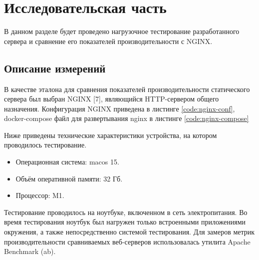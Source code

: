 \section{Исследовательская часть}
В данном разделе будет проведено нагрузочное тестирование разработанного сервера и сравнение его показателей производительности с NGINX.

\subsection{Описание измерений}
В качестве эталона для сравнения показателей производительности статического сервера был выбран NGINX [7], являющийся HTTP-сервером общего назначения. Конфигурация NGINX приведена в листинге \ref{code:nginx-conf}, docker-compose файл для развертывания nginx в листинге \ref{code:nginx-compose}


\newpage


Ниже приведены технические характеристики устройства, на котором проводилось тестирование.
\begin{itemize}
	\item Операционная система: macos 15.
	\item Объём оперативной памяти: 32 Гб.
	\item Процессор: M1.
\end{itemize}

Тестирование проводилось на ноутбуке, включенном в сеть электропитания. Во время тестирования ноутбук был нагружен только встроенными приложениями окружения, а также непосредственно системой тестирования.
Для замеров метрик производительности сравниваемых веб-серверов использовалась утилита Apache Benchmark (ab)\cite{ab}.

